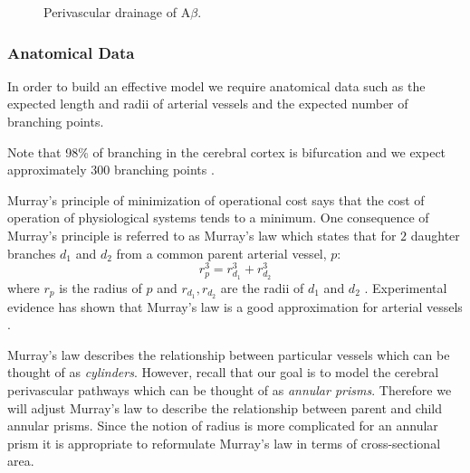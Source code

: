 \documentclass[12pt]{article} %
\theoremstyle{definition}
\begin{document}
  



\begin{figure}[H]

              \centering
                \caption{Perivascular drainage of A$\beta$.}
\end{figure}
\subsubsection{Anatomical Data}\label{sec:ana}


 
In order to build an effective model we require anatomical data such as the expected length
 and radii of arterial vessels and the expected number of branching points.     

Note that 98\% of branching in the cerebral cortex is bifurcation and we expect approximately 
300 branching points \cite{Cassot}. 

Murray's principle of minimization of operational cost says that the cost of operation of
 physiological systems tends to a minimum.  One consequence of Murray’s principle is referred 
to as Murray's law which states that for $2$ daughter branches $d_{1}$ and $d_{2}$ from a 
common parent arterial vessel, $p$: 
\[r_{p}^{3} = r_{d_{1}}^{3} + r_{d_{2}}^{3}\]
where $r_{p}$ is the radius of $p$ and $r_{d_{1}},r_{d_{2}}$ are the radii of $d_{1}$ and 
$d_{2}$ \cite{Murray}.
Experimental evidence has shown that Murray's law is a good approximation for 
arterial vessels \cite{Cohn,Zamir}.

Murray's law describes the relationship between particular vessels which can be thought of as 
\emph{cylinders}.  However, recall that our goal is to model the cerebral perivascular pathways
which can be thought of as \emph{annular prisms}.  Therefore we will adjust Murray's law to describe 
the relationship between parent and child annular prisms.  Since the notion of radius is more 
complicated for an annular prism it is appropriate to reformulate Murray's law in terms of 
cross-sectional area.   
\end{document}
